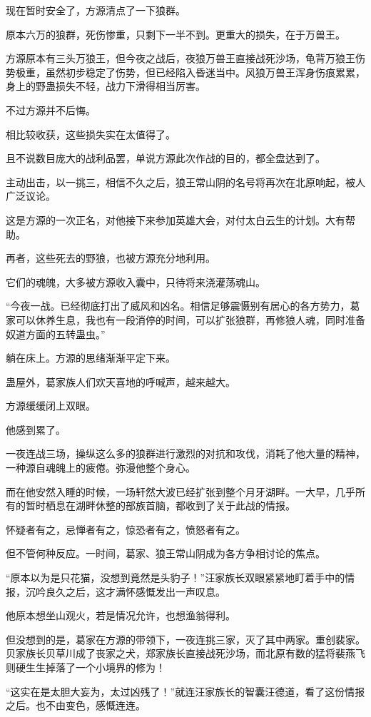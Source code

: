 \begin{this_body}
现在暂时安全了，方源清点了一下狼群。

原本六万的狼群，死伤惨重，只剩下一半不到。更重大的损失，在于万兽王。

方源原本有三头万狼王，但今夜之战后，夜狼万兽王直接战死沙场，龟背万狼王伤势极重，虽然初步稳定了伤势，但已经陷入昏迷当中。风狼万兽王浑身伤痕累累，身上的野蛊损失不轻，战力下滑得相当厉害。

不过方源并不后悔。

相比较收获，这些损失实在太值得了。

且不说数目庞大的战利品罢，单说方源此次作战的目的，都全盘达到了。

主动出击，以一挑三，相信不久之后，狼王常山阴的名号将再次在北原响起，被人广泛议论。

这是方源的一次正名，对他接下来参加英雄大会，对付太白云生的计划。大有帮助。

再者，这些死去的野狼，也被方源充分地利用。

它们的魂魄，大多被方源收入囊中，只待将来浇灌荡魂山。

“今夜一战。已经彻底打出了威风和凶名。相信足够震慑别有居心的各方势力，葛家可以休养生息，我也有一段消停的时间，可以扩张狼群，再修狼人魂，同时准备奴道方面的五转蛊虫。”

躺在床上。方源的思绪渐渐平定下来。

蛊屋外，葛家族人们欢天喜地的呼喊声，越来越大。

方源缓缓闭上双眼。

他感到累了。

一夜连战三场，操纵这么多的狼群进行激烈的对抗和攻伐，消耗了他大量的精神，一种源自魂魄上的疲倦。弥漫他整个身心。

而在他安然入睡的时候，一场轩然大波已经扩张到整个月牙湖畔。一大早，几乎所有的暂时栖息在湖畔休整的部族首脑，都收到了关于此战的情报。

怀疑者有之，忌惮者有之，惊恐者有之，愤怒者有之。

但不管何种反应。一时间，葛家、狼王常山阴成为各方争相讨论的焦点。

“原本以为是只花猫，没想到竟然是头豹子！”汪家族长双眼紧紧地盯着手中的情报，沉吟良久之后，这才满怀感慨发出一声叹息。

他原本想坐山观火，若是情况允许，也想渔翁得利。

但没想到的是，葛家在方源的带领下，一夜连挑三家，灭了其中两家。重创裴家。贝家族长贝草川成了丧家之犬，郑家族长直接战死沙场，而北原有数的猛将裴燕飞则硬生生掉落了一个小境界的修为！

“这实在是太胆大妄为，太过凶残了！”就连汪家族长的智囊汪德道，看了这份情报之后。也不由变色，感慨连连。


\end{this_body}
